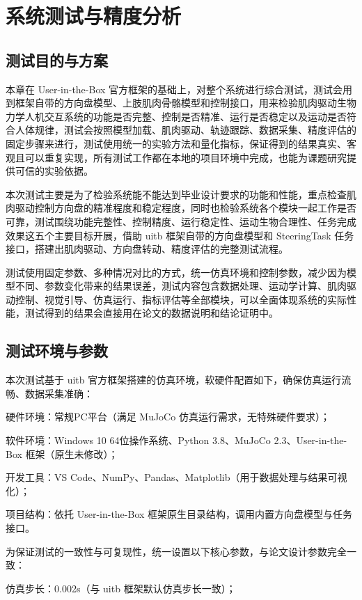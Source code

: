 
\chapter{系统测试与精度分析}
\section{测试目的与方案}
本章在 User-in-the-Box 官方框架的基础上，对整个系统进行综合测试，测试会用到框架自带的方向盘模型、上肢肌肉骨骼模型和控制接口，用来检验肌肉驱动生物力学人机交互系统的功能是否完整、控制是否精准、运行是否稳定以及运动是否符合人体规律，测试会按照模型加载、肌肉驱动、轨迹跟踪、数据采集、精度评估的固定步骤来进行，测试使用统一的实验方法和量化指标，保证得到的结果真实、客观且可以重复实现，所有测试工作都在本地的项目环境中完成，也能为课题研究提供可信的实验依据。

本次测试主要是为了检验系统能不能达到毕业设计要求的功能和性能，重点检查肌肉驱动控制方向盘的精准程度和稳定程度，同时也检验系统各个模块一起工作是否可靠，测试围绕功能完整性、控制精度、运行稳定性、运动生物合理性、任务完成效果这五个主要目标开展，借助 uitb 框架自带的方向盘模型和 SteeringTask 任务接口，搭建出肌肉驱动、方向盘转动、精度评估的完整测试流程。

测试使用固定参数、多种情况对比的方式，统一仿真环境和控制参数，减少因为模型不同、参数变化带来的结果误差，测试内容包含数据处理、运动学计算、肌肉驱动控制、视觉引导、仿真运行、指标评估等全部模块，可以全面体现系统的实际性能，测试得到的结果会直接用在论文的数据说明和结论证明中。
\section{测试环境与参数}
本次测试基于 uitb 官方框架搭建的仿真环境，软硬件配置如下，确保仿真运行流畅、数据采集准确：

硬件环境：常规PC平台（满足 MuJoCo 仿真运行需求，无特殊硬件要求）；

软件环境：Windows 10 64位操作系统、Python 3.8、MuJoCo 2.3、User-in-the-Box 框架（原生未修改）；

开发工具：VS Code、NumPy、Pandas、Matplotlib（用于数据处理与结果可视化）；

项目结构：依托 User-in-the-Box 框架原生目录结构，调用内置方向盘模型与任务接口。

为保证测试的一致性与可复现性，统一设置以下核心参数，与论文设计参数完全一致：

仿真步长：0.002s（与 uitb 框架默认仿真步长一致）；

